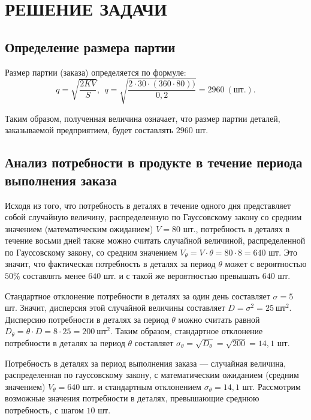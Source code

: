 \section{РЕШЕНИЕ ЗАДАЧИ}

\subsection{Определение размера партии}

Размер партии (заказа) определяется по формуле:
\begin{equation*}
	q = \sqrt{\dfrac{2KV}{S}}, ~~ q = \sqrt{\dfrac{2 \cdot 30 \cdot (360 \cdot 80))}{0,2}} = 2960 \: (\text{шт.}).
\end{equation*}

Таким образом, полученная величина означает, что размер партии деталей,
заказываемой предприятием, будет составлять $2960$ шт.


\subsection{Анализ потребности в продукте в течение периода \\ выполнения заказа}

Исходя из того, что потребность в деталях в течение одного дня представляет
собой случайную величину, распределенную по Гауссовскому закону со средним значением
(математическим ожиданием) $V=80$ шт., потребность в деталях в течение восьми дней
также можно считать случайной величиной, распределенной по Гауссовскому закону,
со средним значением $V_\theta = V \cdot \theta = 80 \cdot 8 = 640 $ шт.
Это значит, что фактическая потребность в деталях за период $\theta$ может
с вероятностью $50\%$ составлять менее $640$ шт. и с такой же вероятностью превышать $640$ шт.

Стандартное отклонение потребности в деталях за один день составляет $\sigma=5$ шт.
Значит, дисперсия этой случайной величины составляет $D = \sigma^2 = 25 \: \text{шт}^2 $.
Дисперсию потребности в деталях за период $\theta$ можно считать равной
$D_\theta = \theta \cdot D = 8 \cdot 25 = 200 \: \text{шт}^2$. Таким образом,
стандартное отклонение потребности в деталях за период $\theta$ составляет
$\sigma_{\theta} = \sqrt{D_\theta} = \sqrt{200} = 14{,}1 $ шт.

Потребность в деталях за период выполнения заказа ---
случайная величина, распределенная по гауссовскому закону, с математическим
ожиданием (средним значением)  $V_\theta = 640 $ шт. и стандартным отклонением $\sigma_{\theta} = 14{,}1 $ шт.
Рассмотрим возможные значения потребности в деталях, превышающие среднюю потребность, с шагом $10$ шт.

